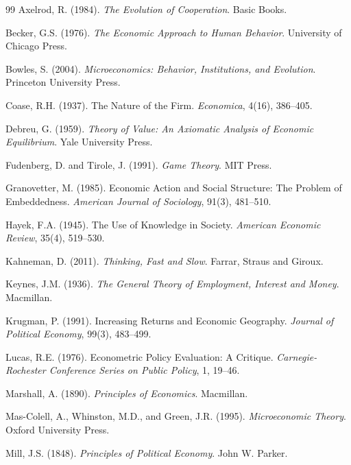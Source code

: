 \documentclass[12pt,a4paper]{article}
\begin{document}
\begin{thebibliography}{99}
Axelrod, R. (1984).
\emph{The Evolution of Cooperation}.
Basic Books.

Becker, G.S. (1976).
\emph{The Economic Approach to Human Behavior}.
University of Chicago Press.

Bowles, S. (2004).
\emph{Microeconomics: Behavior, Institutions, and Evolution}.
Princeton University Press.

Coase, R.H. (1937).
The Nature of the Firm.
\emph{Economica}, 4(16), 386–405.

Debreu, G. (1959).
\emph{Theory of Value: An Axiomatic Analysis of Economic Equilibrium}.
Yale University Press.

Fudenberg, D. and Tirole, J. (1991).
\emph{Game Theory}.
MIT Press.

Granovetter, M. (1985).
Economic Action and Social Structure: The Problem of Embeddedness.
\emph{American Journal of Sociology}, 91(3), 481–510.

Hayek, F.A. (1945).
The Use of Knowledge in Society.
\emph{American Economic Review}, 35(4), 519–530.

Kahneman, D. (2011).
\emph{Thinking, Fast and Slow}.
Farrar, Straus and Giroux.

Keynes, J.M. (1936).
\emph{The General Theory of Employment, Interest and Money}.
Macmillan.

Krugman, P. (1991).
Increasing Returns and Economic Geography.
\emph{Journal of Political Economy}, 99(3), 483–499.

Lucas, R.E. (1976).
Econometric Policy Evaluation: A Critique.
\emph{Carnegie-Rochester Conference Series on Public Policy}, 1, 19–46.

Marshall, A. (1890).
\emph{Principles of Economics}.
Macmillan.

Mas-Colell, A., Whinston, M.D., and Green, J.R. (1995).
\emph{Microeconomic Theory}.
Oxford University Press.

Mill, J.S. (1848).
\emph{Principles of Political Economy}.
John W. Parker.


\end{thebibliography}
\end{document}
